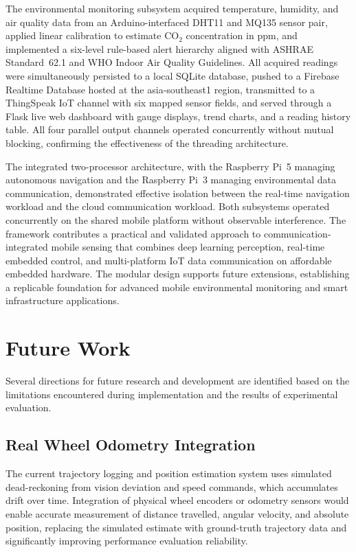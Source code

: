The environmental monitoring subsystem acquired temperature, humidity,
and air quality data from an Arduino-interfaced DHT11 and MQ135 sensor
pair, applied linear calibration to estimate CO$_2$ concentration in
ppm, and implemented a six-level rule-based alert hierarchy aligned
with ASHRAE Standard~62.1 and WHO Indoor Air Quality Guidelines. All
acquired readings were simultaneously persisted to a local SQLite
database, pushed to a Firebase Realtime Database hosted at the
asia-southeast1 region, transmitted to a ThingSpeak IoT channel with
six mapped sensor fields, and served through a Flask live web dashboard
with gauge displays, trend charts, and a reading history table. All
four parallel output channels operated concurrently without mutual
blocking, confirming the effectiveness of the threading architecture.

The integrated two-processor architecture, with the Raspberry Pi~5
managing autonomous navigation and the Raspberry Pi~3 managing
environmental data communication, demonstrated effective isolation
between the real-time navigation workload and the cloud communication
workload. Both subsystems operated concurrently on the shared mobile
platform without observable interference. The framework contributes a
practical and validated approach to communication-integrated mobile
sensing that combines deep learning perception, real-time embedded
control, and multi-platform IoT data communication on affordable
embedded hardware. The modular design supports future extensions,
establishing a replicable foundation for advanced mobile environmental
monitoring and smart infrastructure applications.

\section{Future Work}

Several directions for future research and development are identified
based on the limitations encountered during implementation and the
results of experimental evaluation.

\subsection{Real Wheel Odometry Integration}

The current trajectory logging and position estimation system uses
simulated dead-reckoning from vision deviation and speed commands,
which accumulates drift over time. Integration of physical wheel
encoders or odometry sensors would enable accurate measurement of
distance travelled, angular velocity, and absolute position, replacing
the simulated estimate with ground-truth trajectory data and
significantly improving performance evaluation reliability.

